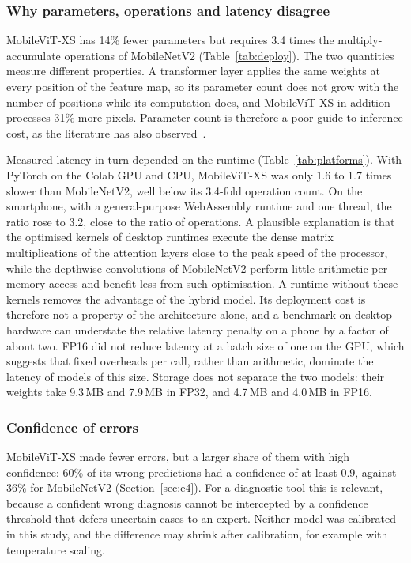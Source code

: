 \documentclass[conference]{IEEEtran}
\begin{document}
\subsubsection{Why parameters, operations and latency disagree}
MobileViT-XS has 14\% fewer parameters but requires 3.4 times the multiply-accumulate operations of MobileNetV2 (Table~\ref{tab:deploy}). The two quantities measure different properties. A transformer layer applies the same weights at every position of the feature map, so its parameter count does not grow with the number of positions while its computation does, and MobileViT-XS in addition processes 31\% more pixels. Parameter count is therefore a poor guide to inference cost, as the literature has also observed~\cite{ma2018shufflenetv2,mehta2022mobilevitv2}.

Measured latency in turn depended on the runtime (Table~\ref{tab:platforms}). With PyTorch on the Colab GPU and CPU, MobileViT-XS was only 1.6 to 1.7 times slower than MobileNetV2, well below its 3.4-fold operation count. On the smartphone, with a general-purpose WebAssembly runtime and one thread, the ratio rose to 3.2, close to the ratio of operations. A plausible explanation is that the optimised kernels of desktop runtimes execute the dense matrix multiplications of the attention layers close to the peak speed of the processor, while the depthwise convolutions of MobileNetV2 perform little arithmetic per memory access and benefit less from such optimisation. A runtime without these kernels removes the advantage of the hybrid model. Its deployment cost is therefore not a property of the architecture alone, and a benchmark on desktop hardware can understate the relative latency penalty on a phone by a factor of about two. FP16 did not reduce latency at a batch size of one on the GPU, which suggests that fixed overheads per call, rather than arithmetic, dominate the latency of models of this size. Storage does not separate the two models: their weights take 9.3\,MB and 7.9\,MB in FP32, and 4.7\,MB and 4.0\,MB in FP16.

\subsubsection{Confidence of errors}
MobileViT-XS made fewer errors, but a larger share of them with high confidence: 60\% of its wrong predictions had a confidence of at least 0.9, against 36\% for MobileNetV2 (Section~\ref{sec:e4}). For a diagnostic tool this is relevant, because a confident wrong diagnosis cannot be intercepted by a confidence threshold that defers uncertain cases to an expert. Neither model was calibrated in this study, and the difference may shrink after calibration, for example with temperature scaling.
\end{document}

